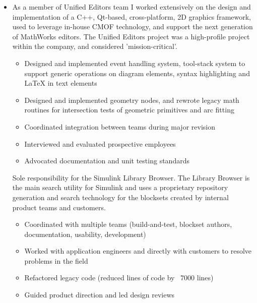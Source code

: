 \documentclass[11pt,a4paper,sans]{moderncv}        %
\begin{document}
\begin{itemize}

  \item{}

    As a member of Unified Editors team I worked extensively on the design and
    implementation of a C++, Qt-based, cross-platform, 2D graphics framework,
    used to leverage in-house CMOF technology, and support the next generation
    of MathWorks editors. The Unified Editors project was a high-profile project
    within the company, and considered 'mission-critical'.

    \begin{itemize}
      \item{Designed and implemented event handling system, tool-stack system to support generic operations on diagram elements, syntax highlighting and LaTeX in text elements}
      \item{Designed and implemented geometry nodes, and rewrote legacy math routines for intersection tests of geometric primitives and arc fitting}
      \item{Coordinated integration between teams during major revision}
      \item{Interviewed and evaluated prospective employees}
      \item{Advocated documentation and unit testing standards}
    \end{itemize}


    Sole responsibility for the Simulink Library Browser. The Library Browser is
    the main search utility for Simulink and uses a proprietary repository
    generation and search technology for the blocksets created by internal
    product teams and customers.

    \begin{itemize}
      \item{Coordinated with multiple teams (build-and-test, blockset authors, documentation, usability, development)}
      \item{Worked with application engineers and directly with customers to resolve problems in the field}
      \item{Refactored legacy code (reduced lines of code by ~7000 lines)}
      \item{Guided product direction and led design reviews}
    \end{itemize}

\end{itemize}
\end{document}
